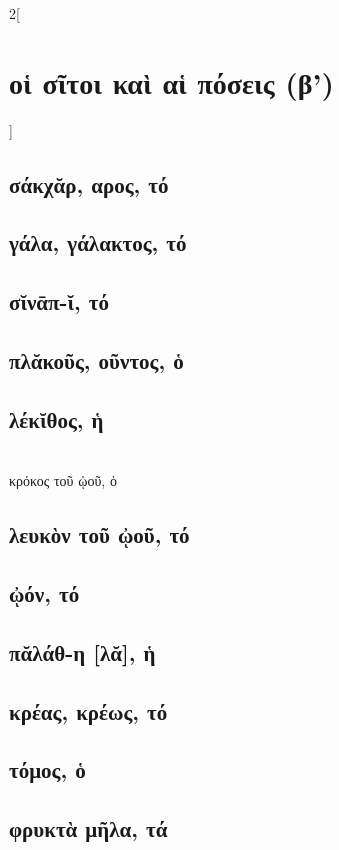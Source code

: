 \documentclass{book}
\begin{document}
\begin{multicols}{2}[\section{οἱ σῖτοι καὶ αἱ πόσεις (β')}]
\subsection{σάκχᾰρ, αρος, τό}
\subsection{γάλα, γάλακτος, τό}
\subsection{σῐνᾱπ-ῐ, τό}
\subsection{πλᾰκοῦς, οῦντος, ὁ}
\subsection{λέκῐθος, ἡ}
 ~\\
κρόκος τοῦ ᾠοῦ, ὁ
\subsection{λευκὸν τοῦ ᾠοῦ, τό}
\subsection{ᾠόν, τό}
\subsection{πᾰλάθ-η [λᾰ], ἡ}
\subsection{κρέας, κρέως, τό}
\subsection{τόμος, ὁ}
\subsection{φρυκτὰ μῆλα, τά}

\end{multicols}
\end{document}
